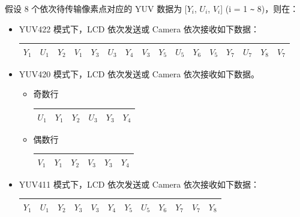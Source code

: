 \documentclass[main\_\_CN.tex]{subfiles}
\begin{document}
假设 8 个依次待传输像素点对应的 YUV 数据为 [$Y_i$, $U_i$, $V_i$] (i = 1 \verb+~+ 8)，则在：
\begin{itemize}
    \item YUV422 模式下，LCD 依次发送或 Camera 依次接收如下数据：
        \begin{table}[H]
            \centering
            \begin{tabular}{|c|c|c|c|c|c|c|c|c|c|c|c|c|c|c|c|}
            \hline
            $Y_1$ & $U_1$ & $Y_2$ & $V_1$ & $Y_3$ & $U_3$ & $Y_4$ & $V_3$ & $Y_5$ & $U_5$ & $Y_6$ & $V_5$ & $Y_7$ & $U_7$ & $Y_8$ & $V_7$ \\ \hline
            \end{tabular}
        \end{table}
    \item YUV420 模式下，LCD 依次发送或 Camera 依次接收如下数据。
    \begin{itemize}    
        \item 奇数行
        \begin{table}[H]
            \centering
            \begin{tabular}{|c|c|c|c|c|c|}
            \hline
            $U_1$ & $Y_1$ & $Y_2$ & $U_3$ & $Y_3$ & $Y_4$ \\ \hline
            \end{tabular}
        \end{table} 
        \item 偶数行
        \begin{table}[H]
            \centering
            \begin{tabular}{|c|c|c|c|c|c|}
            \hline
            $V_1$ & $Y_1$ & $Y_2$ & $V_3$ & $Y_3$ & $Y_4$ \\ \hline
            \end{tabular}
        \end{table}
    \end{itemize}
    \item YUV411 模式下，LCD 依次发送或 Camera 依次接收如下数据：
        \begin{table}[H]
            \centering
            \begin{tabular}{|c|c|c|c|c|c|c|c|c|c|c|c|}
            \hline
            $Y_1$ & $U_1$ & $Y_2$ & $Y_3$ & $V_3$ & $Y_4$ & $Y_5$ & $U_5$ & $Y_6$ & $Y_7$ & $V_7$ & $Y_8$ \\ \hline
            \end{tabular}
        \end{table}
\end{itemize}
\end{document}
